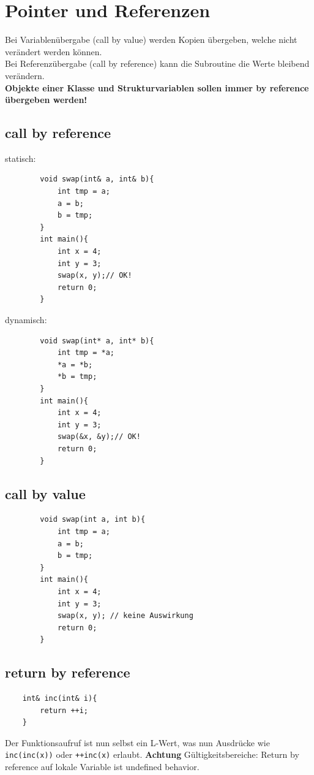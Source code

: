 \section{Pointer und Referenzen} 
Bei Variablenübergabe (call by value) werden Kopien übergeben, welche nicht verändert werden können.\\
Bei Referenzübergabe (call by reference) kann die Subroutine die Werte bleibend verändern. \\
\textbf{Objekte einer Klasse und Strukturvariablen sollen immer by reference übergeben werden!} \\
\subsection{call by reference}
\vspace{-13pt}
\begin{multicols}{2}
	statisch:
	\begin{lstlisting}
		void swap(int& a, int& b){
			int tmp = a;
			a = b;
			b = tmp;
		}
		int main(){
			int x = 4;
			int y = 3;
			swap(x, y);// OK!
			return 0;
		}	
	\end{lstlisting}
	dynamisch:
	\begin{lstlisting}
		void swap(int* a, int* b){
			int tmp = *a;
			*a = *b;
			*b = tmp;
		}
		int main(){
			int x = 4;
			int y = 3;
			swap(&x, &y);// OK!
			return 0;
		}
	\end{lstlisting}
\end{multicols}
\subsection{call by value}
	\begin{lstlisting}
		void swap(int a, int b){
			int tmp = a;
			a = b;
			b = tmp;
		}
		int main(){
			int x = 4;
			int y = 3;
			swap(x, y); // keine Auswirkung
			return 0;
		}	
	\end{lstlisting}
\subsection{return by reference}
\begin{lstlisting}
	int& inc(int& i){
		return ++i;
	}	
\end{lstlisting}
Der Funktionsaufruf ist nun selbst ein L-Wert, was nun Ausdrücke wie \texttt{inc(inc(x))} oder \texttt{++inc(x)} erlaubt. \textbf{Achtung} Gültigkeitsbereiche: Return by reference auf lokale Variable ist undefined behavior.
